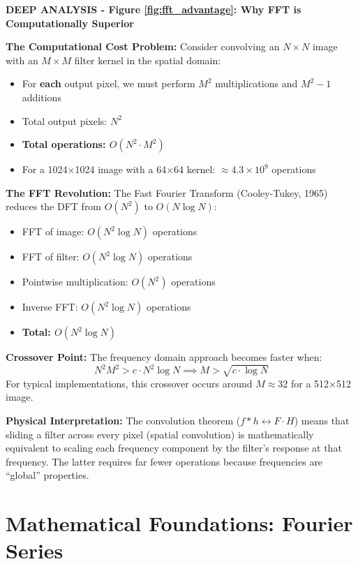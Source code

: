 \documentclass[12pt,a4paper]{article}
\begin{document}
\begin{deepexplanation}
\textbf{DEEP ANALYSIS - Figure \ref{fig:fft_advantage}: Why FFT is Computationally Superior}

\textbf{The Computational Cost Problem:}
Consider convolving an $N \times N$ image with an $M \times M$ filter kernel in the spatial domain:
\begin{itemize}
    \item For \textbf{each} output pixel, we must perform $M^2$ multiplications and $M^2 - 1$ additions
    \item Total output pixels: $N^2$
    \item \textbf{Total operations: $O(N^2 \cdot M^2)$}
    \item For a 1024×1024 image with a 64×64 kernel: $\approx 4.3 \times 10^9$ operations
\end{itemize}

\textbf{The FFT Revolution:}
The Fast Fourier Transform (Cooley-Tukey, 1965) reduces the DFT from $O(N^2)$ to $O(N \log N)$:
\begin{itemize}
    \item FFT of image: $O(N^2 \log N)$ operations
    \item FFT of filter: $O(N^2 \log N)$ operations
    \item Pointwise multiplication: $O(N^2)$ operations
    \item Inverse FFT: $O(N^2 \log N)$ operations
    \item \textbf{Total: $O(N^2 \log N)$}
\end{itemize}

\textbf{Crossover Point:}
The frequency domain approach becomes faster when:
\[
N^2 M^2 > c \cdot N^2 \log N \implies M > \sqrt{c \cdot \log N}
\]
For typical implementations, this crossover occurs around $M \approx 32$ for a 512×512 image.

\textbf{Physical Interpretation:}
The convolution theorem ($f * h \leftrightarrow F \cdot H$) means that sliding a filter across every pixel (spatial convolution) is mathematically equivalent to scaling each frequency component by the filter's response at that frequency. The latter requires far fewer operations because frequencies are ``global'' properties.
\end{deepexplanation}

\section{Mathematical Foundations: Fourier Series}
\end{document}
